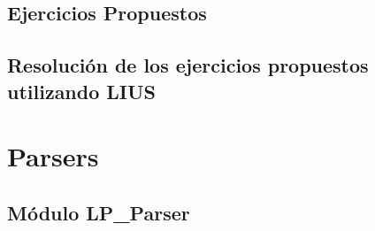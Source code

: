 \documentclass[a4paper]{report}
\begin{document}
\section{Ejercicios Propuestos}
\toDo

\section{Resolución de los ejercicios propuestos utilizando LIUS}
\label{sec:2.7}

\toDo

\appendix
\clearpage
\addappheadtotoc
\appendixpage
\chapter{Parsers}
\newpage
\section{Módulo LP\_Parser}
\label{sec:A1.LPParser}

\toDo
\end{document}
